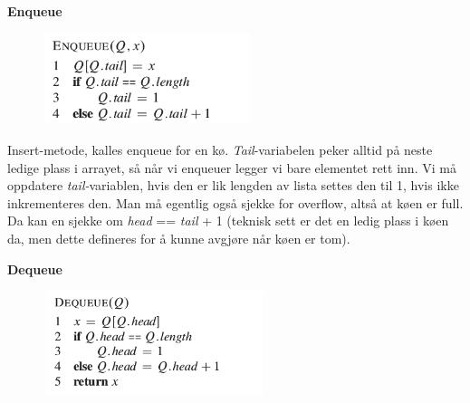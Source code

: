 \documentclass[12pt]{report}
\begin{document}
\begin{multicols}{2}
\textbf{Enqueue}\par


\vspace{\baselineskip}



\begin{figure}[H]
	\begin{Center}
		\includegraphics[width=2.4in,height=1.05in]{./media/image7.png}
	\end{Center}
\end{figure}



\par


\vspace{\baselineskip}
Insert-metode, kalles enqueue for en kø. \textit{Tail}-variabelen peker alltid på neste ledige plass i arrayet, så når vi enqueuer legger vi bare elementet rett inn. Vi må oppdatere \textit{tail-}variablen, hvis den er lik lengden av lista settes den til 1, hvis ikke inkrementeres den. Man må egentlig også sjekke for overflow, altså at køen er full. Da kan en sjekke om \textit{head }== \textit{tail }+ 1 (teknisk sett er det en ledig plass i køen da, men dette defineres for å kunne avgjøre når køen er tom).\par

\textbf{Dequeue}\par


\vspace{\baselineskip}



\begin{figure}[H]
	\begin{Center}
		\includegraphics[width=2.57in,height=1.21in]{./media/image8.png}
	\end{Center}
\end{figure}



\end{multicols}
\end{document}
